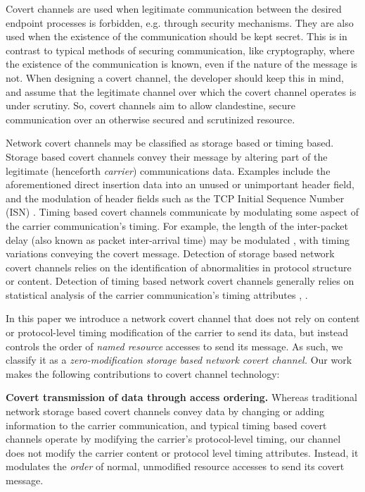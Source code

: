 \documentclass[10pt, conference]{IEEEtran}
\begin{document}
Covert channels are used when legitimate communication between the desired endpoint processes is forbidden, e.g. through security mechanisms.  They are also used when the existence of the communication should be kept secret.  This is in contrast to typical methods of securing communication, like cryptography, where the existence of the communication is known, even if the nature of the message is not.  When designing a covert channel, the developer should keep this in mind, and assume that the legitimate channel over which the covert channel operates is under scrutiny.  So, covert channels aim to allow clandestine, secure communication over an otherwise secured and scrutinized resource.

Network covert channels may be classified as storage based or timing based.  Storage based covert channels convey their message by altering part of the legitimate (henceforth {\em carrier}) communications data.  Examples include the aforementioned direct insertion data into an unused or unimportant header field, and the modulation of header fields such as the TCP Initial Sequence Number (ISN) \cite{Goher12}.  Timing based covert channels communicate by modulating some aspect of the carrier communication's timing.  For example, the length of the inter-packet delay (also known as packet inter-arrival time) may be modulated \cite{Cabuk04}, with timing variations conveying the covert message.  Detection of storage based network covert channels relies on the identification of abnormalities in protocol structure or content.  Detection of timing based network covert channels generally relies on statistical analysis of the carrier communication's timing attributes \cite{Cabuk04}, \cite{Cabuk09}.

In this paper we introduce a network covert channel that does not rely on content or protocol-level timing modification of the carrier to send its data, but instead controls the order of {\em named resource} accesses to send its message.  As such, we classify it as a {\em zero-modification storage based network covert channel.}  Our work makes the following contributions to covert channel technology:

{\bf Covert transmission of data through access ordering.}
Whereas traditional network storage based covert channels convey data by changing or adding information to the carrier communication, and typical timing based covert channels operate by modifying the carrier's protocol-level timing, our channel does not modify the carrier content or protocol level timing attributes.  Instead, it modulates the {\em order} of normal, unmodified resource accesses to send its covert message.
\end{document}
